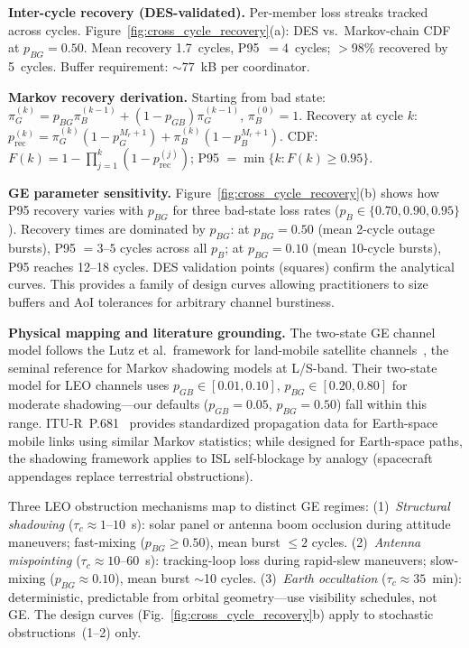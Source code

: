 \documentclass[journal]{IEEEtran}
\begin{document}
\textbf{Inter-cycle recovery (DES-validated).} Per-member loss streaks tracked across cycles. Figure~\ref{fig:cross_cycle_recovery}(a): DES vs.\ Markov-chain CDF at $p_{BG} = 0.50$. Mean recovery 1.7~cycles, P95~$= 4$~cycles; $>$98\% recovered by 5~cycles. Buffer requirement: ${\sim}77$~kB per coordinator.

\textbf{Markov recovery derivation.} Starting from bad state: $\pi_G^{(k)} = p_{BG} \pi_B^{(k-1)} + (1 - p_{GB}) \pi_G^{(k-1)}$, $\pi_B^{(0)} = 1$. Recovery at cycle $k$: $p_{\text{rec}}^{(k)} = \pi_G^{(k)}(1 - p_G^{M_r+1}) + \pi_B^{(k)}(1 - p_B^{M_r+1})$. CDF: $F(k) = 1 - \prod_{j=1}^{k}(1 - p_{\text{rec}}^{(j)})$; P95 $= \min\{k : F(k) \geq 0.95\}$.

\textbf{GE parameter sensitivity.} Figure~\ref{fig:cross_cycle_recovery}(b) shows how P95 recovery varies with $p_{BG}$ for three bad-state loss rates ($p_B \in \{0.70, 0.90, 0.95\}$). Recovery times are dominated by $p_{BG}$: at $p_{BG} = 0.50$ (mean 2-cycle outage bursts), P95 $= 3$--$5$ cycles across all $p_B$; at $p_{BG} = 0.10$ (mean 10-cycle bursts), P95 reaches 12--18 cycles. DES validation points (squares) confirm the analytical curves. This provides a family of design curves allowing practitioners to size buffers and AoI tolerances for arbitrary channel burstiness.

\textbf{Physical mapping and literature grounding.} The two-state GE channel model follows the Lutz et al.\ framework for land-mobile satellite channels~\cite{lutz_1991}, the seminal reference for Markov shadowing models at L/S-band. Their two-state model for LEO channels uses $p_{GB} \in [0.01, 0.10]$, $p_{BG} \in [0.20, 0.80]$ for moderate shadowing---our defaults ($p_{GB} = 0.05$, $p_{BG} = 0.50$) fall within this range. ITU-R~P.681~\cite{itu_p681} provides standardized propagation data for Earth-space mobile links using similar Markov statistics; while designed for Earth-space paths, the shadowing framework applies to ISL self-blockage by analogy (spacecraft appendages replace terrestrial obstructions).

Three LEO obstruction mechanisms map to distinct GE regimes: (1)~\emph{Structural shadowing} ($\tau_c \approx 1$--$10$~s): solar panel or antenna boom occlusion during attitude maneuvers; fast-mixing ($p_{BG} \geq 0.50$), mean burst $\leq 2$ cycles. (2)~\emph{Antenna mispointing} ($\tau_c \approx 10$--$60$~s): tracking-loop loss during rapid-slew maneuvers; slow-mixing ($p_{BG} \approx 0.10$), mean burst $\sim$10 cycles. (3)~\emph{Earth occultation} ($\tau_c \approx 35$~min): deterministic, predictable from orbital geometry---use visibility schedules, not GE. The design curves (Fig.~\ref{fig:cross_cycle_recovery}b) apply to stochastic obstructions~(1--2) only.
\end{document}
